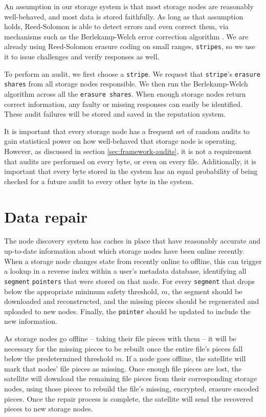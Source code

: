 \documentclass[11pt,fleqn,openany]{book}
\newcommand{\x}[1]{{\tt #1}} \newcommand{\code}[1]{{\em #1}}
\begin{document}
An assumption in our storage system is that most storage nodes are
reasonably well-behaved, and most data is stored faithfully. As long as that
assumption holds, Reed-Solomon is able to detect errors and even correct them,
via mechanisms such as the Berlekamp-Welch error correction algorithm \cite{bw}.
We are already using Reed-Solomon erasure coding
\cite{rs} on small ranges, \x{stripes}, so we use it to issue challenges and
verify responses as well.

To perform an audit, we first choose a \x{stripe}. We request that
\x{stripe}'s \x{erasure shares} from all storage nodes responsible. We then run
the Berlekamp-Welch algorithm \cite{bw} across all the \x{erasure shares}. When
enough storage nodes return correct information, any faulty or missing responses
can easily be identified. These audit failures will be stored and saved in the
reputation system.

It is important that every storage node has a frequent set of random audits to
gain statistical power on how well-behaved that storage node is operating. However, as
discussed in section \ref{sec:framework-audits}, it is
not a requirement that audits are performed on every byte, or even on every
file.
Additionally, it is important that every byte stored in the system has an equal
probability of being checked for a future audit to every other byte in the
system.

\section{Data repair}\label{sec:concrete-data-repair}

The node discovery system has caches in place that have reasonably accurate and
up-to-date information about which storage nodes have been online recently.
When a storage node changes state from recently online to offline, this can
trigger a lookup in a reverse index within a user's metadata database, identifying
all \x{segment} \x{pointers} that were stored on that node.
For every \x{segment} that drops below the appropriate minimum safety
threshold, $m$, the segment should be downloaded and reconstructed, and the
missing pieces should be regenerated and uploaded to new nodes. Finally, the
\x{pointer} should be updated to include the new information.

As storage nodes go offline -- taking their file pieces with them -- it will
be necessary for the missing pieces to be rebuilt once the entire file's pieces
fall below the predetermined threshold $m$. If a node goes offline, the
satellite will mark that nodes' file pieces as missing.
Once enough file pieces are lost, the satellite will download the
remaining file pieces from their corresponding storage nodes, using those
pieces
to rebuild the file's missing, encrypted, erasure encoded pieces.
Once the repair process is complete, the satellite will send the
recovered pieces to new storage nodes.
\end{document}
